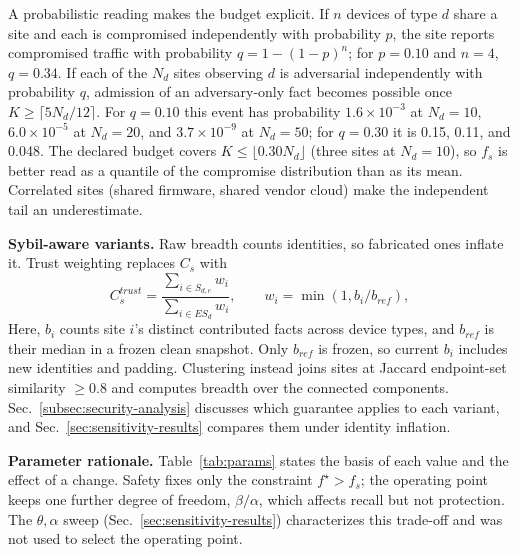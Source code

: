 \documentclass[journal]{IEEEtran}
\theoremstyle{definition}
\begin{document}
A probabilistic reading makes the budget explicit. If $n$ devices of type $d$ share a site and each is compromised independently with probability $p$, the site reports compromised traffic with probability $q=1-(1-p)^n$; for $p=0.10$ and $n=4$, $q=0.34$. If each of the $N_d$ sites observing $d$ is adversarial independently with probability $q$, admission of an adversary-only fact becomes possible once $K\ge\lceil5N_d/12\rceil$. For $q=0.10$ this event has probability $1.6\times10^{-3}$ at $N_d=10$, $6.0\times10^{-5}$ at $N_d=20$, and $3.7\times10^{-9}$ at $N_d=50$; for $q=0.30$ it is 0.15, 0.11, and 0.048. The declared budget covers $K\le\lfloor0.30N_d\rfloor$ (three sites at $N_d=10$), so $f_s$ is better read as a quantile of the compromise distribution than as its mean. Correlated sites (shared firmware, shared vendor cloud) make the independent tail an underestimate.

\textbf{Sybil-aware variants.} Raw breadth counts identities, so fabricated ones inflate it. Trust weighting replaces $C_s$ with
\[
C_s^{trust}=\frac{\sum_{i\in S_{d,e}}w_i}{\sum_{i\in ES_d}w_i},\qquad w_i=\min(1,b_i/b_{ref}),
\]
Here, $b_i$ counts site $i$'s distinct contributed facts across device types, and $b_{ref}$ is their median in a frozen clean snapshot. Only $b_{ref}$ is frozen, so current $b_i$ includes new identities and padding. Clustering instead joins sites at Jaccard endpoint-set similarity $\ge0.8$ and computes breadth over the connected components. Sec.~\ref{subsec:security-analysis} discusses which guarantee applies to each variant, and Sec.~\ref{sec:sensitivity-results} compares them under identity inflation.

\textbf{Parameter rationale.} Table~\ref{tab:params} states the basis of each value and the effect of a change. Safety fixes only the constraint $f^\star>f_s$; the operating point keeps one further degree of freedom, $\beta/\alpha$, which affects recall but not protection. The $\theta,\alpha$ sweep (Sec.~\ref{sec:sensitivity-results}) characterizes this trade-off and was not used to select the operating point.
\end{document}
